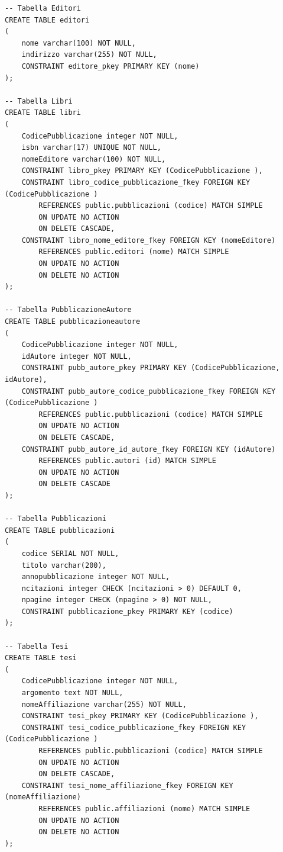 \documentclass[a4paper,12pt]{article}
\begin{document}
\begin{lstlisting}
-- Tabella Editori
CREATE TABLE editori
(
    nome varchar(100) NOT NULL,
    indirizzo varchar(255) NOT NULL,
    CONSTRAINT editore_pkey PRIMARY KEY (nome)
);

-- Tabella Libri
CREATE TABLE libri
(
    CodicePubblicazione integer NOT NULL,
    isbn varchar(17) UNIQUE NOT NULL,
    nomeEditore varchar(100) NOT NULL,
    CONSTRAINT libro_pkey PRIMARY KEY (CodicePubblicazione ),
    CONSTRAINT libro_codice_pubblicazione_fkey FOREIGN KEY (CodicePubblicazione )
        REFERENCES public.pubblicazioni (codice) MATCH SIMPLE
        ON UPDATE NO ACTION
        ON DELETE CASCADE,
    CONSTRAINT libro_nome_editore_fkey FOREIGN KEY (nomeEditore)
        REFERENCES public.editori (nome) MATCH SIMPLE
        ON UPDATE NO ACTION
        ON DELETE NO ACTION
);

-- Tabella PubblicazioneAutore
CREATE TABLE pubblicazioneautore
(
    CodicePubblicazione integer NOT NULL,
    idAutore integer NOT NULL,
    CONSTRAINT pubb_autore_pkey PRIMARY KEY (CodicePubblicazione, idAutore),
    CONSTRAINT pubb_autore_codice_pubblicazione_fkey FOREIGN KEY (CodicePubblicazione )
        REFERENCES public.pubblicazioni (codice) MATCH SIMPLE
        ON UPDATE NO ACTION
        ON DELETE CASCADE,
    CONSTRAINT pubb_autore_id_autore_fkey FOREIGN KEY (idAutore)
        REFERENCES public.autori (id) MATCH SIMPLE
        ON UPDATE NO ACTION
        ON DELETE CASCADE
);

-- Tabella Pubblicazioni
CREATE TABLE pubblicazioni
(
    codice SERIAL NOT NULL,
    titolo varchar(200),
    annopubblicazione integer NOT NULL,
    ncitazioni integer CHECK (ncitazioni > 0) DEFAULT 0,
    npagine integer CHECK (npagine > 0) NOT NULL,
    CONSTRAINT pubblicazione_pkey PRIMARY KEY (codice)
);

-- Tabella Tesi
CREATE TABLE tesi
(
    CodicePubblicazione integer NOT NULL,
    argomento text NOT NULL,
    nomeAffiliazione varchar(255) NOT NULL,
    CONSTRAINT tesi_pkey PRIMARY KEY (CodicePubblicazione ),
    CONSTRAINT tesi_codice_pubblicazione_fkey FOREIGN KEY (CodicePubblicazione )
        REFERENCES public.pubblicazioni (codice) MATCH SIMPLE
        ON UPDATE NO ACTION
        ON DELETE CASCADE,
    CONSTRAINT tesi_nome_affiliazione_fkey FOREIGN KEY (nomeAffiliazione)
        REFERENCES public.affiliazioni (nome) MATCH SIMPLE
        ON UPDATE NO ACTION
        ON DELETE NO ACTION
);

\end{lstlisting}
\end{document}
